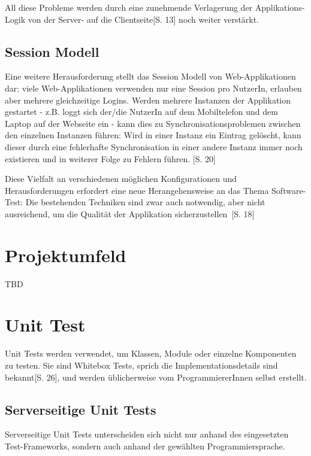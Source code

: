 \documentclass[a4paper,bibtotoc,oneside]{scrbook}
\begin{document}
All diese Probleme werden durch eine zunehmende Verlagerung der Applikations-Logik von der Server- auf die Clientseite\cite{testing_apps_on_web}[S. 13] noch weiter verstärkt. 

\section{Session Modell}
Eine weitere Herausforderung stellt das Session Modell von Web-Applikationen dar: viele Web-Applikationen verwenden nur eine Session pro NutzerIn, erlauben aber mehrere gleichzeitige Logins. Werden mehrere Instanzen der Applikation gestartet - z.B. loggt sich der/die NutzerIn auf dem Mobiltelefon und dem Laptop auf der Webseite ein - kann dies zu Synchronisationsproblemen zwischen den einzelnen Instanzen führen: Wird in einer Instanz ein Eintrag gelöscht, kann dieser durch eine fehlerhafte Synchronisation in einer andere Instanz immer noch existieren und in weiterer Folge zu Fehlern führen. \cite{testing_apps_on_web}[S. 20]


Diese Vielfalt an verschiedenen möglichen Konfigurationen und Herausforderungen erfordert eine neue Herangehensweise an das Thema Software-Test: Die bestehenden Techniken sind \glqq zwar auch notwendig, aber nicht ausreichend, um die Qualität der Applikation sicherzustellen\grqq\ \cite{eval_automat_webapp_test}[S. 18]


\chapter{Projektumfeld}
TBD

\chapter{Unit Test}

Unit Tests werden verwendet, um Klassen, Module oder einzelne Komponenten zu testen. Sie sind Whitebox Tests, sprich die Implementationsdetails sind bekannt\cite{betrieb}[S. 26], und werden üblicherweise vom ProgrammiererInnen selbst erstellt. 

\section{Serverseitige Unit Tests}
Serverseitige Unit Tests unterscheiden sich nicht nur anhand des eingesetzten Test-Frameworks, sondern auch anhand der gewählten Programmiersprache. 
\end{document}
